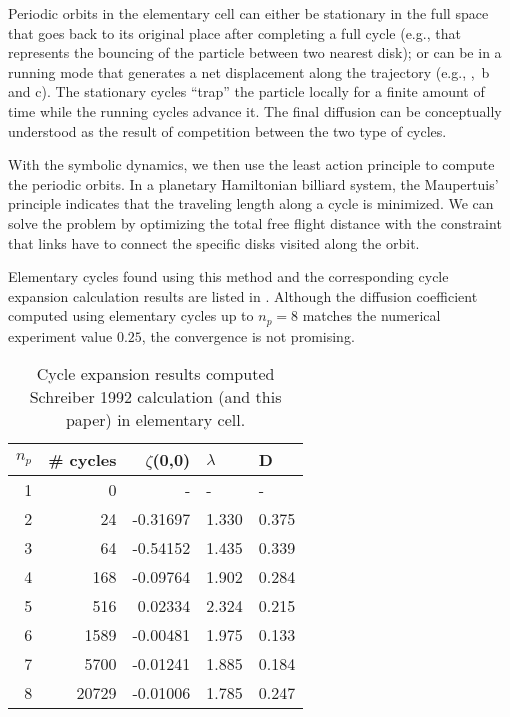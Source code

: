 Periodic orbits in the elementary cell can either be stationary in the
full space that goes back to its original place after completing a full
cycle (e.g.,  that represents the bouncing of the particle
between two nearest disk); or can be in a running mode that generates a
net displacement along the trajectory (e.g., ,
\,b and c). The stationary cycles
``trap'' the  particle locally for a finite amount of time while the
running cycles advance it. The final diffusion  can
be conceptually understood as the result of competition between the two
type of cycles.

With the symbolic dynamics, we then use the least action principle to
compute the periodic orbits. In a planetary Hamiltonian
billiard system, the Maupertuis' principle indicates that the traveling
length along a cycle is minimized. We can solve the problem by optimizing
the total free flight distance with the constraint that links have to
connect the specific disks visited along the orbit.

Elementary cycles found using this method and the corresponding cycle
expansion calculation results are listed in . Although the
diffusion coefficient computed using elementary cycles up to $n_p = 8$
matches the numerical experiment value $0.25$, the convergence is not
promising.

\begin{table}[htbp]
\begin{tabular}{|r|r|r|l|l|}
\hline
${n_p}$ & \# cycles & $\zeta$(0,0) & $\lambda$ & D \\ \hline\hline
1      & 0      &   -    &   -  &   - \\
2      & 24     & -0.31697 & 1.330 & 0.375\\
3      & 64     & -0.54152 & 1.435 & 0.339\\
4      & 168    & -0.09764 & 1.902 & 0.284\\
5      & 516    &  0.02334 & 2.324 & 0.215\\
6      & 1589   & -0.00481 & 1.975 & 0.133\\
7      & 5700   & -0.01241 & 1.885 & 0.184\\
8      & 20729  & -0.01006 & 1.785 & 0.247\\ \hline

\end{tabular}
\caption{\label{TCELL1}
Cycle expansion results computed Schreiber 1992 calculation (and
  this paper) in elementary cell.
}
\end{table}

